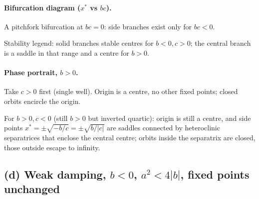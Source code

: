 \documentclass[11pt]{article}
\begin{document}
\paragraph{Bifurcation diagram ($x^*$ vs $bc$).} A pitchfork bifurcation at $bc=0$: side branches exist only for $bc<0$.
\begin{center}
\end{center}
Stability legend: solid branches stable centres for $b<0,c>0$; the central branch is a saddle in that range and a centre for $b>0$.

\paragraph{Phase portrait, $b>0$.} Take $c>0$ first (single well). Origin is a centre, no other fixed points; closed orbits encircle the origin.
\begin{center}
\end{center}
For $b>0,c<0$ (still $b>0$ but inverted quartic): origin is still a centre, and side points $x^*=\pm\sqrt{-b/c}=\pm\sqrt{b/|c|}$ are saddles connected by heteroclinic separatrices that enclose the central centre; orbits inside the separatrix are closed, those outside escape to infinity.

\subsection*{(d) Weak damping, $b<0$, $a^2<4|b|$, fixed points unchanged}
\end{document}

